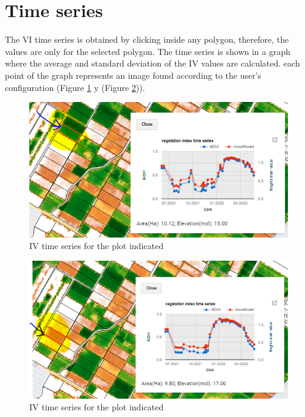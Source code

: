 \documentclass[
]{book}
\begin{document}
\hypertarget{time-series}{%
\section{Time series}\label{time-series}}

The VI time series is obtained by clicking inside any polygon, therefore, the values are only for the selected polygon. The time series is shown in a graph where the average and standard deviation of the IV values are calculated. each point of the graph represents an image found according to the user's configuration (Figure \ref{fig:figI10} y (Figure \ref{fig:figI11})).

\begin{figure}

{\centering \includegraphics{./images/Figure60} 

}

\caption{IV time series for the plot indicated}\label{fig:figI10}
\end{figure}
\begin{figure}

{\centering \includegraphics{./images/Figure61} 

}

\caption{IV time series for the plot indicated}\label{fig:figI11}
\end{figure}
\end{document}
